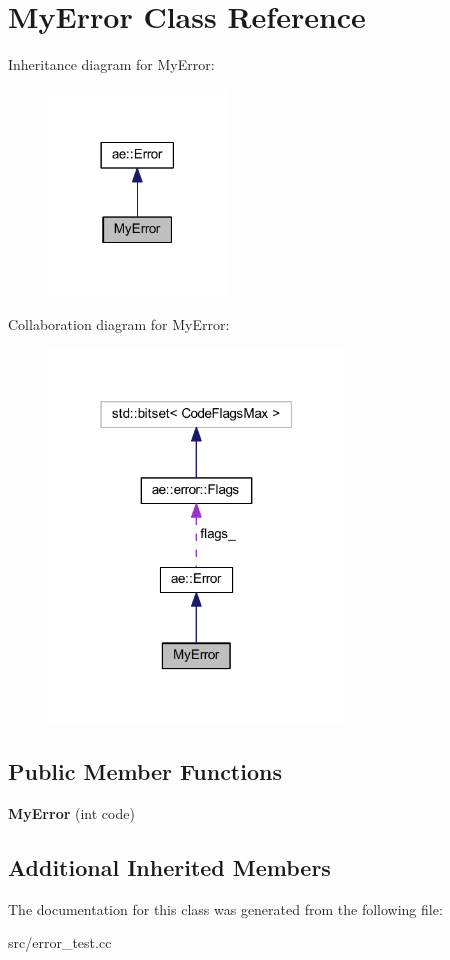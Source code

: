 \hypertarget{class_my_error}{}\section{My\+Error Class Reference}
\label{class_my_error}


Inheritance diagram for My\+Error\+:
\nopagebreak
\begin{figure}[H]
\begin{center}
\leavevmode
\includegraphics[width=134pt]{class_my_error__inherit__graph}
\end{center}
\end{figure}


Collaboration diagram for My\+Error\+:
\nopagebreak
\begin{figure}[H]
\begin{center}
\leavevmode
\includegraphics[width=223pt]{class_my_error__coll__graph}
\end{center}
\end{figure}
\subsection*{Public Member Functions}
\begin{DoxyCompactItemize}
\item 
\hypertarget{class_my_error_a92df252c67b7a3589f8aba5e7f197eba}{}\label{class_my_error_a92df252c67b7a3589f8aba5e7f197eba} 
{\bfseries My\+Error} (int code)
\end{DoxyCompactItemize}
\subsection*{Additional Inherited Members}


The documentation for this class was generated from the following file\+:\begin{DoxyCompactItemize}
\item 
src/error\+\_\+test.\+cc\end{DoxyCompactItemize}
